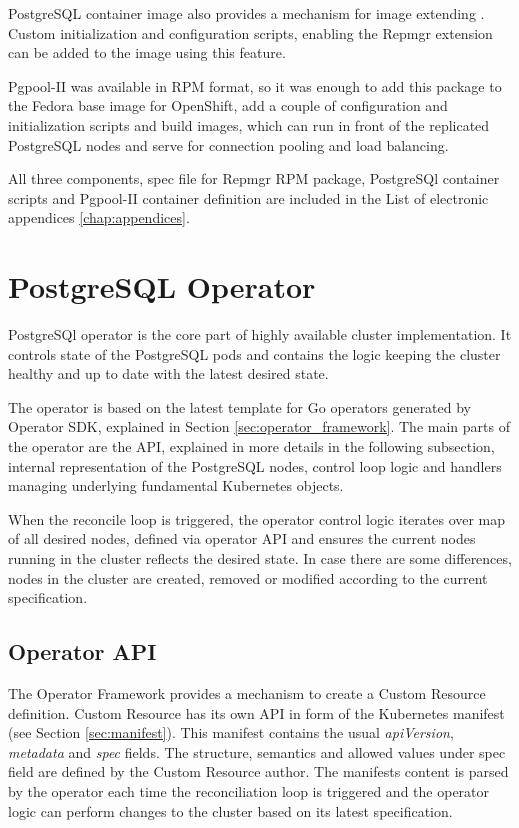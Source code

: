 \documentclass[
  digital, %
  twoside, %
  table,   %
  lof,     %
  lot,     %
]{fithesis3}
\begin{document}
PostgreSQL container image also provides a mechanism for image extending \cite{pg_cnt_extending}. Custom initialization and configuration scripts, enabling the Repmgr extension can be added to the image using this feature.

Pgpool-II was available in RPM format, so it was enough to add this package to the Fedora base image for OpenShift, add a couple of configuration and initialization scripts and build images, which can run in front of the replicated PostgreSQL nodes and serve for connection pooling and load balancing.

All three components, spec file for Repmgr RPM package, PostgreSQl container scripts and Pgpool-II container definition are included in the List of electronic appendices \ref{chap:appendices}.

\section{PostgreSQL Operator}
PostgreSQl operator is the core part of highly available cluster implementation. It controls state of the PostgreSQL pods and contains the logic keeping the cluster healthy and up to date with the latest desired state.

The operator is based on the latest template for Go operators generated by Operator SDK, explained in Section \ref{sec:operator_framework}. The main parts of the operator are the API, explained in more details in the following subsection, internal representation of the PostgreSQL nodes, control loop logic and handlers managing underlying fundamental Kubernetes objects.

When the reconcile loop is triggered, the operator control logic iterates over map of all desired nodes, defined via operator API and ensures the current nodes running in the cluster reflects the desired state. In case there are some differences, nodes in the cluster are created, removed or modified according to the current specification.

\subsection{Operator API} \label{sec:operator_api}
The Operator Framework provides a mechanism to create a Custom Resource definition. Custom Resource has its own API in form of the Kubernetes manifest (see Section \ref{sec:manifest}). This manifest contains the usual \textit{apiVersion}, \textit{metadata} and \textit{spec} fields. The structure, semantics and allowed values under spec field are defined by the Custom Resource author. The manifests content is parsed by the operator each time the reconciliation loop is triggered and the operator logic can perform changes to the cluster based on its latest specification.
\end{document}
